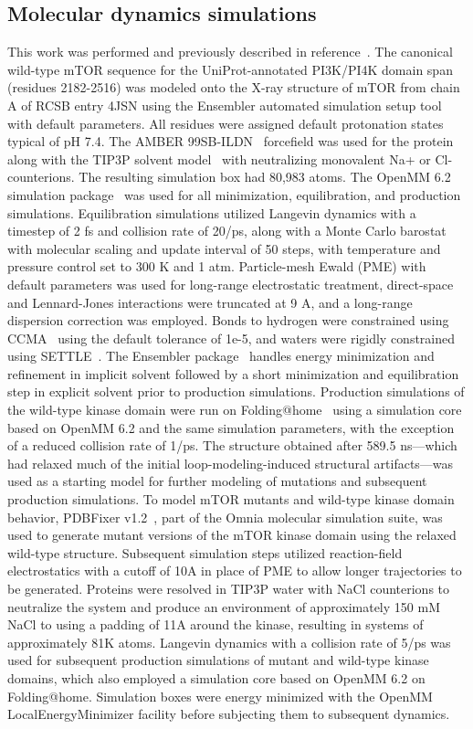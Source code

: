\documentclass[phd,tocprelim]{cornell}
\begin{document}
\subsection{Molecular dynamics simulations}
This work was performed and previously described in reference~\cite{Xu:2016fw}. The canonical wild-type mTOR sequence for the UniProt-annotated PI3K/PI4K domain span (residues 2182-2516) was modeled onto the X-ray structure of mTOR from chain A of
RCSB entry 4JSN using the Ensembler automated simulation setup tool~\citep{Parton:2016cc} with default parameters. All residues were assigned default protonation states typical of pH 7.4. The AMBER 99SB-ILDN~\citep{LindorffLarsen:2010ei} forcefield was used for the protein along with the TIP3P solvent model~\citep{Jorgensen:1998fl} with neutralizing monovalent Na+ or Cl- counterions. The resulting simulation box had 80,983 atoms. The OpenMM 6.2 simulation package~\citep{Eastman:2017kn} was used for all minimization, equilibration, and production simulations. Equilibration simulations utilized Langevin dynamics with a timestep of 2 fs and collision rate of 20/ps, along with a Monte Carlo barostat with molecular scaling and update interval of 50 steps, with temperature and pressure control set to 300 K and 1 atm. Particle-mesh Ewald (PME) with default parameters was used for long-range electrostatic treatment, direct-space and Lennard-Jones interactions were truncated at 9 A, and a long-range dispersion correction was employed. Bonds to hydrogen were constrained using CCMA~\citep{Eastman:2010hq} using the default tolerance of 1e-5, and waters were rigidly constrained using SETTLE~\citep{Miyamoto:1992fx}. The Ensembler package~\citep{Parton:2016cc} handles energy minimization and refinement in implicit solvent followed by a short minimization and equilibration step in explicit solvent prior to production simulations.
Production simulations of the wild-type kinase domain were run on Folding@home~\citep{Shirts:2000du} using a simulation core based on OpenMM 6.2 and the same simulation parameters, with the exception of a reduced collision rate of 1/ps. The structure obtained after 589.5 ns---which had relaxed much of the initial loop-modeling-induced structural artifacts---was used as a starting model for further modeling of mutations and subsequent production simulations.
To model mTOR mutants and wild-type kinase domain behavior, PDBFixer v1.2~\citep{Eastman:2013bo}, part of the Omnia molecular simulation suite, was used to generate mutant versions of the mTOR kinase domain using the relaxed wild-type structure. Subsequent simulation steps utilized reaction-field electrostatics with a cutoff of 10A in place of PME to allow longer trajectories to be generated. Proteins were resolved in TIP3P water with NaCl counterions to neutralize the system and produce an environment of approximately 150 mM NaCl to using a padding of 11A around the kinase, resulting in systems of approximately 81K atoms. Langevin dynamics with a collision rate of 5/ps was used for subsequent production simulations of mutant and wild-type kinase domains, which also employed a simulation core based on OpenMM 6.2 on Folding@home. Simulation boxes were energy minimized with the OpenMM LocalEnergyMinimizer facility before subjecting them to subsequent dynamics.
\end{document}
